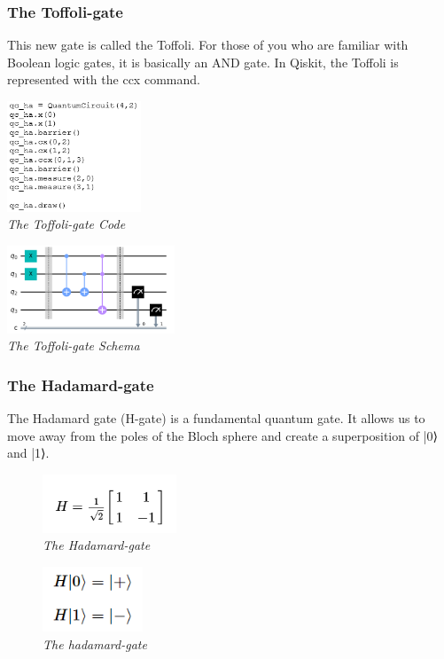 \documentclass{article}
\begin{document}
\subsubsection{The Toffoli-gate} 
This new gate is called the Toffoli. For those of you who are familiar with Boolean logic gates, it is basically an AND gate.
In Qiskit, the Toffoli is represented with the ccx command.
\begin{mdframed}
\begin{center}
\begin{minipage}[b]{4cm}
\centering
\includegraphics[width=4cm]{toffoli_code.png}\\\textit{The Toffoli-gate Code}
\end{minipage}
\begin{minipage}[b]{5cm}
\centering
\includegraphics[width=5cm]{toffoli_schema.png}\\\textit{The Toffoli-gate Schema}
\end{minipage}
\end{center}
\end{mdframed}
\subsubsection{The Hadamard-gate} 
The Hadamard gate (H-gate) is a fundamental quantum gate. It allows us to move away from the poles of the Bloch sphere and create a superposition of |0⟩ and |1⟩. 
\begin{figure}[h]
\begin{center}
\begin{minipage}[b]{4cm}
\centering
\includegraphics[width=4cm]{hadamard_gate.png}\\\textit{The Hadamard-gate}
\end{minipage}
\begin{minipage}[b]{5cm}
\centering
\includegraphics[width=3cm]{hadamard_gate_transformation.png}\\\textit{The hadamard-gate}
\end{minipage}
\end{center}
\end{figure}
\newpage
\end{document}
